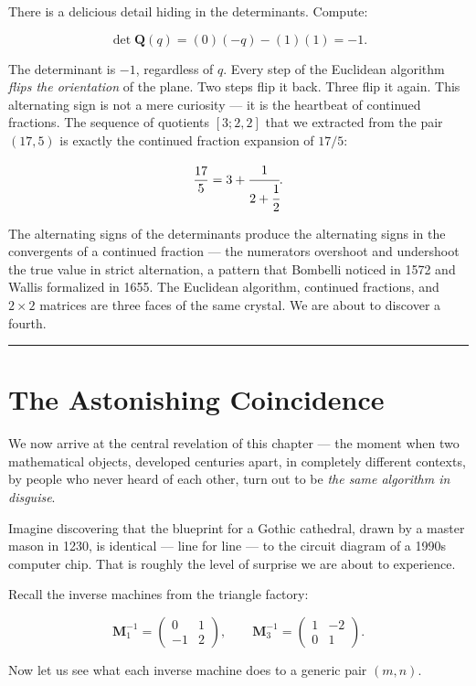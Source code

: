 There is a delicious detail hiding in the determinants. Compute:

\[
\det \mathbf{Q}(q) = (0)(- q) - (1)(1) = -1.
\]

The determinant is \(-1\), regardless of \(q\). Every step of the Euclidean algorithm \emph{flips the orientation} of the plane. Two steps flip it back. Three flip it again. This alternating sign is not a mere curiosity --- it is the heartbeat of continued fractions. The sequence of quotients \([3; 2, 2]\) that we extracted from the pair \((17, 5)\) is exactly the continued fraction expansion of \(17/5\):

\[
\frac{17}{5} = 3 + \cfrac{1}{2 + \cfrac{1}{2}}.
\]

The alternating signs of the determinants produce the alternating signs in the convergents of a continued fraction --- the numerators overshoot and undershoot the true value in strict alternation, a pattern that Bombelli noticed in 1572 and Wallis formalized in 1655. The Euclidean algorithm, continued fractions, and \(2 \times 2\) matrices are three faces of the same crystal. We are about to discover a fourth.

\bigskip\noindent\rule{\linewidth}{0.4pt}\bigskip

\section{The Astonishing Coincidence}
We now arrive at the central revelation of this chapter --- the moment when two mathematical objects, developed centuries apart, in completely different contexts, by people who never heard of each other, turn out to be \emph{the same algorithm in disguise}.

Imagine discovering that the blueprint for a Gothic cathedral, drawn by a master mason in 1230, is identical --- line for line --- to the circuit diagram of a 1990s computer chip. That is roughly the level of surprise we are about to experience.

Recall the inverse machines from the triangle factory:

\[
\mathbf{M}_1^{-1} = \begin{pmatrix} 0 & 1 \\ -1 & 2 \end{pmatrix}, \qquad
\mathbf{M}_3^{-1} = \begin{pmatrix} 1 & -2 \\ 0 & 1 \end{pmatrix}.
\]

Now let us see what each inverse machine does to a generic pair \((m, n)\).

